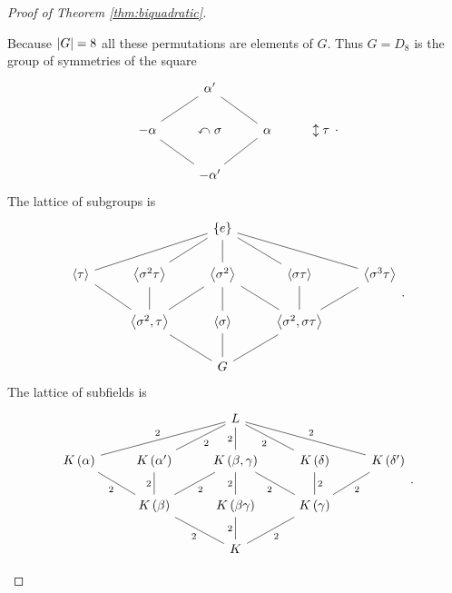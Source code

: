 \begin{proof}[Proof of Theorem \ref{thm:biquadratic}]
\begin{enumerate}
\begin{itemize}
\end{itemize}
Because $ \left\lvert G \right\rvert = 8 $ all these permutations are elements of $ G $. Thus $ G = D_8 $ is the group of symmetries of the square
$$
\begin{tikzcd}
& \alpha' & & \\
-\alpha \arrow[dash]{ur} & \curvearrowleft \sigma & \alpha \arrow[dash]{ul} & \updownarrow \tau \\
& -\alpha' \arrow[dash]{ul} \arrow[dash]{ur} & &
\end{tikzcd}.
$$
The lattice of subgroups is
$$
\begin{tikzcd}
& & \cb{e} & & \\
\ab{\tau} \arrow[dash]{urr} & \ab{\sigma^2\tau} \arrow[dash]{ur} & \ab{\sigma^2} \arrow[dash]{u} & \ab{\sigma\tau} \arrow[dash]{ul} & \ab{\sigma^3\tau} \arrow[dash]{ull} \\
& \ab{\sigma^2, \tau} \arrow[dash]{ul} \arrow[dash]{u} \arrow[dash]{ur} & \ab{\sigma} \arrow[dash]{u} & \ab{\sigma^2, \sigma\tau} \arrow[dash]{ul} \arrow[dash]{u} \arrow[dash]{ur} & \\
& & G \arrow[dash]{ul} \arrow[dash]{u} \arrow[dash]{ur} & &
\end{tikzcd}.
$$
The lattice of subfields is
$$
\begin{tikzcd}
& & L & & \\
K\rb{\alpha} \arrow[dash]{urr}{2} & K\rb{\alpha'} \arrow[dash, swap]{ur}{2} & K\rb{\beta, \gamma} \arrow[dash]{u}{2} & K\rb{\delta} \arrow[dash]{ul}{2} & K\rb{\delta'} \arrow[dash, swap]{ull}{2} \\
& K\rb{\beta} \arrow[dash]{ul}{2} \arrow[dash]{u}{2} \arrow[dash, swap]{ur}{2} & K\rb{\beta\gamma} \arrow[dash]{u}{2} & K\rb{\gamma} \arrow[dash]{ul}{2} \arrow[dash, swap]{u}{2} \arrow[dash, swap]{ur}{2} & \\
& & K \arrow[dash]{ul}{2} \arrow[dash]{u}{2} \arrow[dash, swap]{ur}{2} & &
\end{tikzcd}.
$$



\end{enumerate}
\end{proof}
